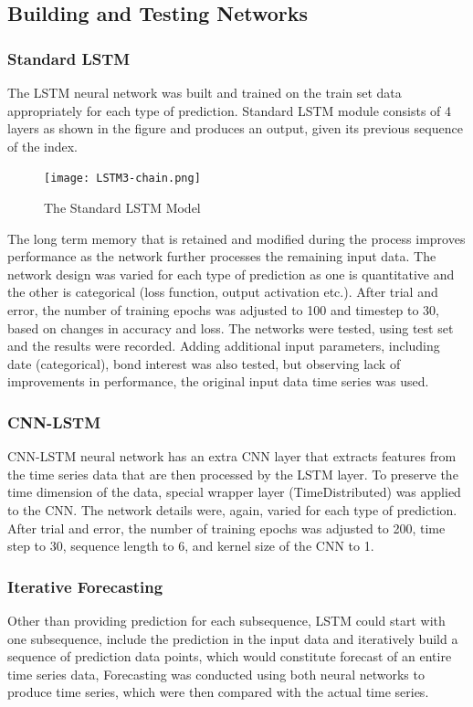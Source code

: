 \documentclass[12pt]{article}
\begin{document}
\subsection{Building and Testing Networks}
\subsubsection{Standard LSTM}
The LSTM neural network was built and trained on the train set data appropriately for each type of prediction. Standard LSTM module consists of 4 layers as shown in the figure and produces an output, given its previous sequence of the index.

\begin{figure}[H]
 \center
 \texttt{[image: LSTM3-chain.png]}
 \caption{The Standard LSTM Model}
\end{figure}

The long term memory that is retained and modified during the process improves performance as the network further processes the remaining input data. The network design was varied for each type of prediction as one is quantitative and the other is categorical (loss function, output activation etc.). After trial and error, the number of training epochs was adjusted to 100 and timestep to 30, based on changes in accuracy and loss. The networks were tested, using test set and the results were recorded. Adding additional input parameters, including date (categorical), bond interest was also tested, but observing lack of improvements in performance, the original input data time series was used.

\subsubsection{CNN-LSTM}
CNN-LSTM neural network has an extra CNN layer that extracts features from the time series data that are then processed by the LSTM layer. To preserve the time dimension of the data, special wrapper layer (TimeDistributed) was applied to the CNN. The network details were, again, varied for each type of prediction. After trial and error, the  number of training epochs was adjusted to 200, time step to 30, sequence length to 6, and kernel size of the CNN to 1.

\subsubsection{Iterative Forecasting}
Other than providing prediction for each subsequence, LSTM could start with one subsequence, include the prediction in the input data and iteratively build a sequence of prediction data points, which would constitute forecast of an entire time series data, Forecasting was conducted using both neural networks to produce time series, which were then compared with the actual time series.
\end{document}
